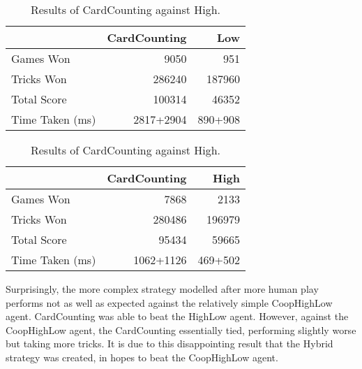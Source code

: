 \begin{table}[ht]
    \begin{minipage}{.525\linewidth}
        \centering
        \begin{tabular}{l|rr}
            ~               &  CardCounting &   Low  \\  \hline
            Games Won       &   9050        &   951   \\
            Tricks Won      &   286240      &   187960 \\
            Total Score     &   100314      &   46352  \\
            Time Taken (ms) &   2817+2904   &   890+908
        \end{tabular}
        \caption{Results of CardCounting ~~ against ~~ Low.}
        \label{tab:cardcounting_low}
    \end{minipage}%
    \begin{minipage}{.525\linewidth}
        \centering
        \begin{tabular}{l|rr}
            ~               &  CardCounting &   High  \\  \hline
            Games Won       &   7868        &   2133   \\
            Tricks Won      &   280486      &   196979 \\
            Total Score     &   95434      &   59665  \\
            Time Taken (ms) &   1062+1126   &   469+502
        \end{tabular}
        \caption{Results of CardCounting against High.}
        \label{tab:cardcounting_high}
    \end{minipage} 
\end{table}


Surprisingly, the more complex strategy modelled after more human play performs not as well as expected against the relatively simple
CoopHighLow agent. CardCounting was able to beat the HighLow agent. However, against the CoopHighLow agent, the CardCounting
essentially tied, performing slightly worse but taking more tricks. It is due to this disappointing result that the Hybrid strategy
was created, in hopes to beat the CoopHighLow agent.

